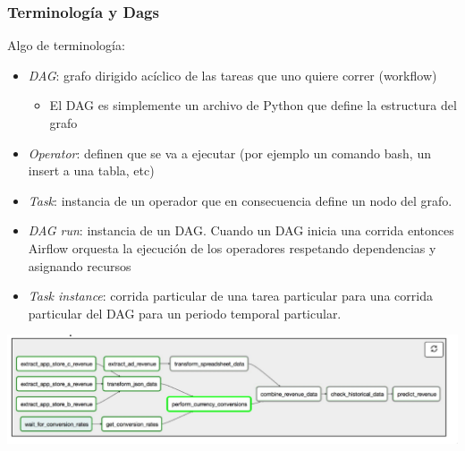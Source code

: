 \documentclass[leqno, 10pt, envcountsect]{beamer}
\numberwithin{equation}{section}
\theoremstyle{definition}
\theoremstyle{example}
\numberwithin{figure}{section}
\numberwithin{table}{section}
\let\olditem\item
\renewcommand{\item}{%
\olditem\vspace{1pt}}
\begin{document}
\begin{frame}[fragile=singleslide]
  \frametitle{Terminología y Dags}
  Algo de terminología:
  \begin{itemize}
    \item \textit{DAG}: grafo dirigido acíclico de las tareas que uno quiere
      correr (workflow)
      \begin{itemize}
        \item El DAG es simplemente un archivo de Python
          que define la estructura del grafo
      \end{itemize}
    \item \textit{Operator}: definen que se va a ejecutar (por ejemplo un comando bash, un insert a una tabla, etc)
    \item \textit{Task}: instancia de un operador que en consecuencia
      define un nodo del grafo.
    \item \textit{DAG run}: instancia de un DAG. Cuando un DAG inicia una
      corrida entonces Airflow orquesta la ejecución de los operadores
      respetando dependencias y asignando recursos
  \item \textit{Task instance}: corrida particular de una tarea particular
    para una corrida particular del DAG para un periodo temporal
      particular.
  \end{itemize}
  \begin{center}
    \includegraphics[scale=0.2]{dag_graph_view.png}
  \end{center}
\end{frame}
\end{document}

